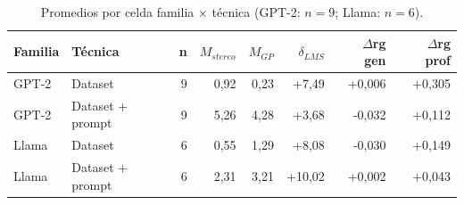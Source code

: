 \begin{table}[H]
\centering\footnotesize
\caption{Promedios por celda familia $\times$ técnica (GPT-2: $n=9$; Llama: $n=6$).}
\label{tab:ex_familia_x_tecnica}
\begin{tabular}{@{}llrrrrrr@{}}
\toprule
\textbf{Familia} & \textbf{Técnica} & \textbf{n} & \textbf{$M_{stereo}$} & \textbf{$M_{GP}$} & \textbf{$\delta_{LMS}$} & \textbf{$\Delta$rg gen} & \textbf{$\Delta$rg prof} \\
\midrule
GPT-2 & Dataset & 9 & 0,92 & 0,23 & +7,49 & +0,006 & +0,305 \\
GPT-2 & Dataset + prompt & 9 & 5,26 & 4,28 & +3,68 & -0,032 & +0,112 \\
Llama & Dataset & 6 & 0,55 & 1,29 & +8,08 & -0,030 & +0,149 \\
Llama & Dataset + prompt & 6 & 2,31 & 3,21 & +10,02 & +0,002 & +0,043 \\
\bottomrule
\end{tabular}
\end{table}